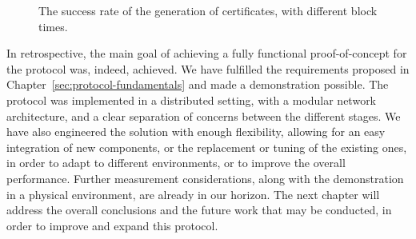 \begin{figure} [h!]
    \begin{center}
        \caption{The success rate of the generation of \pol{} certificates, with different block times.}
        \label{fig:block-time-success-rate}
    \end{center}
\end{figure}

In retrospective, the main goal of achieving a fully functional proof-of-concept for the \pol{} protocol was, indeed, achieved. We have fulfilled the requirements proposed in Chapter~\ref{sec:protocol-fundamentals} and made a demonstration possible. The protocol was implemented in a distributed setting, with a modular network architecture, and a clear separation of concerns between the different stages. We have also engineered the solution with enough flexibility, allowing for an easy integration of new components, or the replacement or tuning of the existing ones, in order to adapt to different environments, or to improve the overall performance. Further measurement considerations, along with the demonstration in a physical environment, are already in our horizon. The next chapter will address the overall conclusions and the future work that may be conducted, in order to improve and expand this \pol{} protocol.


    
